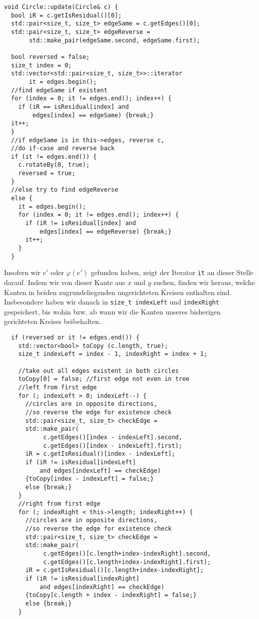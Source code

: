 \begin{lstlisting}
void Circle::update(Circle& c) {
  bool iR = c.getIsResidual()[0];
  std::pair<size_t, size_t> edgeSame = c.getEdges()[0];
  std::pair<size_t, size_t> edgeReverse =
       std::make_pair(edgeSame.second, edgeSame.first);

  bool reversed = false;
  size_t index = 0;
  std::vector<std::pair<size_t, size_t>>::iterator
       it = edges.begin();
  //find edgeSame if existent
  for (index = 0; it != edges.end(); index++) {
    if (iR == isResidual[index] and
        edges[index] == edgeSame) {break;}
  it++;
  }
  //if edgeSame is in this->edges, reverse c,
  //do if-case and reverse back
  if (it != edges.end()) {
    c.rotateBy(0, true);
    reversed = true;
  }
  //else try to find edgeReverse
  else {
    it = edges.begin();
    for (index = 0; it != edges.end(); index++) {
      if (iR != isResidual[index] and 
          edges[index] == edgeReverse) {break;}
      it++;
    }
  }
\end{lstlisting}

Insofern wir $e'$ oder $\varphi(e')$ gefunden haben, zeigt der Iterator \lstinline|it| an dieser Stelle darauf. Indem wir von dieser Kante aus $x$ und $y$ suchen, finden wir heraus, welche Kanten in beiden zugrundeliegenden ungerichteten Kreisen enthalten sind. Insbesondere haben wir danach in \lstinline|size_t indexLeft| und \lstinline|indexRight| gespeichert, bis wohin bzw. ab wann wir die Kanten unseres bisherigen gerichteten Kreises beibehalten.

\begin{lstlisting}
  if (reversed or it != edges.end()) {
    std::vector<bool> toCopy (c.length, true);
    size_t indexLeft = index - 1, indexRight = index + 1;
    
    //take out all edges existent in both circles
    toCopy[0] = false; //first edge not even in tree
    //left from first edge
    for (; indexLeft > 0; indexLeft--) {
      //circles are in opposite directions,
      //so reverse the edge for existence check
      std::pair<size_t, size_t> checkEdge =
      std::make_pair(
           c.getEdges()[index - indexLeft].second,
           c.getEdges()[index - indexLeft].first);
      iR = c.getIsResidual()[index - indexLeft];
      if (iR != isResidual[indexLeft] 
          and edges[indexLeft] == checkEdge)
      {toCopy[index - indexLeft] = false;}
      else {break;}
    }
    //right from first edge
    for (; indexRight < this->length; indexRight++) {
      //circles are in opposite directions,
      //so reverse the edge for existence check
      std::pair<size_t, size_t> checkEdge =
      std::make_pair(
           c.getEdges()[c.length+index-indexRight].second,
           c.getEdges()[c.length+index-indexRight].first);
      iR = c.getIsResidual()[c.length+index-indexRight];
      if (iR != isResidual[indexRight]
          and edges[indexRight] == checkEdge)
      {toCopy[c.length + index - indexRight] = false;}
      else {break;}
    }
\end{lstlisting}

